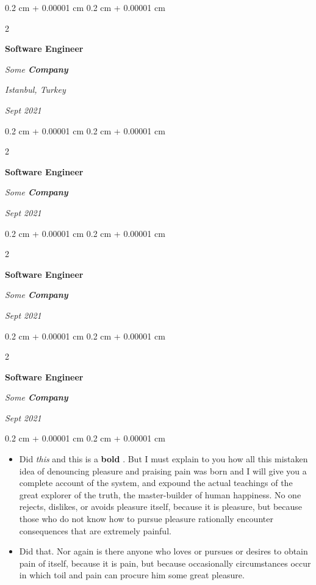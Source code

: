 \documentclass[10pt, letterpaper]{article}
\newenvironment{highlights}{
    \begin{itemize}[
        topsep=0.10 cm,
        parsep=0.10 cm,
        partopsep=0pt,
        itemsep=0pt,
        leftmargin=0.4 cm + 10pt
    ]
}{
    \end{itemize}
} %
\newenvironment{onecolentry}{
    \begin{adjustwidth}{
        0.2 cm + 0.00001 cm
    }{
        0.2 cm + 0.00001 cm
    }
}{
    \end{adjustwidth}
} %
\newenvironment{twocolentry}[2][]{
    \onecolentry
    \def\secondColumn{#2}
    \setcolumnwidth{\fill, 4.5 cm}
    \begin{paracol}{2}
}{
    \switchcolumn \raggedleft \secondColumn
    \end{paracol}
    \endonecolentry
} %
\let\hrefWithoutArrow\href
\renewcommand{\href}[2]{\hrefWithoutArrow{#1}{\ifthenelse{\equal{#2}{}}{ }{#2 }\raisebox{.15ex}{\footnotesize \faExternalLink*}}}
\begin{document}
        \vspace{0.2 cm}

            \begin{twocolentry}{
        \textit{Istanbul, Turkey}

        \textit{Sept 2021}    }
                \textbf{Software Engineer}

                \textit{Some \textbf{Company}}
            \end{twocolentry}



        \vspace{0.2 cm}

            \begin{twocolentry}{


        \textit{Sept 2021}    }
                \textbf{Software Engineer}

                \textit{Some \textbf{Company}}
            \end{twocolentry}



        \vspace{0.2 cm}

            \begin{twocolentry}{


        \textit{Sept 2021}    }
                \textbf{Software Engineer}

                \textit{Some \textbf{Company}}
            \end{twocolentry}



        \vspace{0.2 cm}

            \begin{twocolentry}{


        \textit{Sept 2021}    }
                \textbf{Software Engineer}

                \textit{Some \textbf{Company}}
            \end{twocolentry}

        \vspace{0.10 cm}
        \begin{onecolentry}
            \begin{highlights}
                \item Did \textit{this} and this is a \textbf{bold} \href{https://example.com}{link}. But I must explain to you how all this mistaken idea of denouncing pleasure and praising pain was born and I will give you a complete account of the system, and expound the actual teachings of the great explorer of the truth, the master-builder of human happiness. No one rejects, dislikes, or avoids pleasure itself, because it is pleasure, but because those who do not know how to pursue pleasure rationally encounter consequences that are extremely painful.
                \item Did that. Nor again is there anyone who loves or pursues or desires to obtain pain of itself, because it is pain, but because occasionally circumstances occur in which toil and pain can procure him some great pleasure.
            \end{highlights}
        \end{onecolentry}
\end{document}
